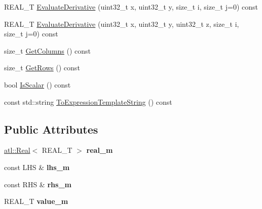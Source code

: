 \begin{DoxyCompactItemize}
\item 
R\+E\+A\+L\+\_\+\+T \hyperlink{structatl_1_1_divide_aa6fdd0114a0fa75e08d772dfba2e6c08}{Evaluate\+Derivative} (uint32\+\_\+t x, uint32\+\_\+t y, size\+\_\+t i, size\+\_\+t j=0) const 
\item 
R\+E\+A\+L\+\_\+\+T \hyperlink{structatl_1_1_divide_aeffb1c9821da7e2332ae608dac5fed45}{Evaluate\+Derivative} (uint32\+\_\+t x, uint32\+\_\+t y, uint32\+\_\+t z, size\+\_\+t i, size\+\_\+t j=0) const 
\item 
size\+\_\+t \hyperlink{structatl_1_1_divide_ac0021998b955347f6f8adcab6027d271}{Get\+Columns} () const 
\item 
size\+\_\+t \hyperlink{structatl_1_1_divide_a8c2e57c4a7de5e95ced4953432e69ccf}{Get\+Rows} () const 
\item 
bool \hyperlink{structatl_1_1_divide_a63953552caab4438cebcfee1a202e0f9}{Is\+Scalar} () const 
\item 
const std\+::string \hyperlink{structatl_1_1_divide_acf032259c4e257e00a929d9cd33f6901}{To\+Expression\+Template\+String} () const 
\end{DoxyCompactItemize}
\subsection*{Public Attributes}
\begin{DoxyCompactItemize}
\item 
\hypertarget{structatl_1_1_divide_a3318f15b1e95a5ff1ababd48cb3e57fd}{\hyperlink{structatl_1_1_real}{atl\+::\+Real}$<$ R\+E\+A\+L\+\_\+\+T $>$ {\bfseries real\+\_\+m}}\label{structatl_1_1_divide_a3318f15b1e95a5ff1ababd48cb3e57fd}

\item 
\hypertarget{structatl_1_1_divide_ac7126091b9651fdb2e8e7486226de9bb}{const L\+H\+S \& {\bfseries lhs\+\_\+m}}\label{structatl_1_1_divide_ac7126091b9651fdb2e8e7486226de9bb}

\item 
\hypertarget{structatl_1_1_divide_abf3fccd9c87ab543801eefc34dbadda0}{const R\+H\+S \& {\bfseries rhs\+\_\+m}}\label{structatl_1_1_divide_abf3fccd9c87ab543801eefc34dbadda0}

\item 
\hypertarget{structatl_1_1_divide_a6fb97b4a014be1e21a2fbcedcc74697a}{R\+E\+A\+L\+\_\+\+T {\bfseries value\+\_\+m}}\label{structatl_1_1_divide_a6fb97b4a014be1e21a2fbcedcc74697a}

\end{DoxyCompactItemize}


